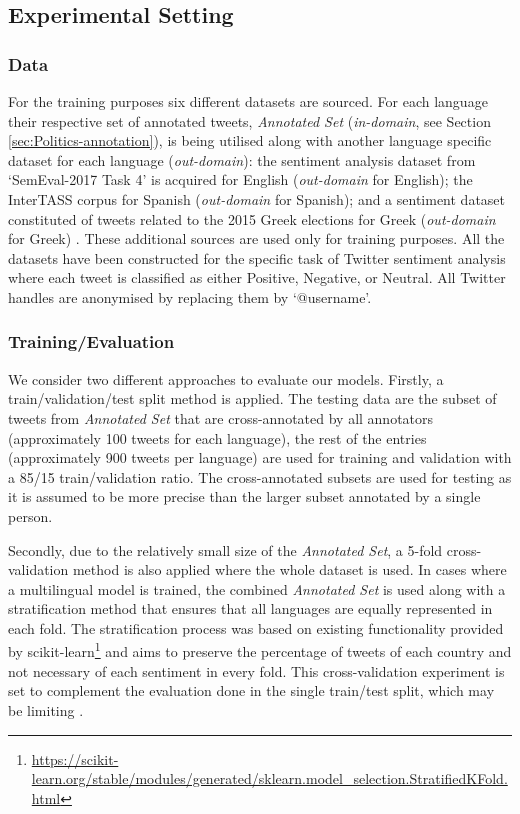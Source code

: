 \subsection{Experimental Setting} \label{sec:expsetting}
\subsubsection{Data} For the training purposes six different datasets are sourced. For each language their respective set of annotated tweets, \textit{Annotated Set} (\textit{in-domain}, see Section \ref{sec:Politics-annotation}), is being utilised along with another language specific dataset for each language (\textit{out-domain}): the sentiment analysis dataset from `SemEval-2017 Task 4' \cite{rosenthal2017semeval} is acquired for English (\textit{out-domain} for English); the InterTASS corpus \cite{diaz2018democratization} for Spanish (\textit{out-domain} for Spanish); and a sentiment dataset constituted of tweets related to the 2015 Greek elections for Greek (\textit{out-domain} for Greek) \cite{tsakalidis2018building}. These additional sources are used only for training purposes. All the datasets  have been constructed for the specific task of Twitter sentiment analysis where each tweet is classified as either Positive, Negative, or Neutral. All Twitter handles are anonymised by replacing them by `@username'.


\subsubsection{Training/Evaluation} We consider two different approaches to evaluate our models. Firstly, a train/validation/test split method is applied. The testing data are the subset of tweets from \textit{Annotated Set} that are cross-annotated by all annotators (approximately 100 tweets for each language), the rest of the entries (approximately 900 tweets per language) are used for training and validation with a 85/15 train/validation ratio. 
The cross-annotated subsets are used for testing as it is assumed to be more precise than the larger subset annotated by a single person.

Secondly, due to the relatively small size of the \textit{Annotated Set}, a 5-fold cross-validation method is also applied where the whole dataset is used. In cases where a multilingual model is trained, the combined \textit{Annotated Set} is used along with a stratification method that ensures that all languages are equally represented in each fold. 
The stratification process was based on existing functionality provided by scikit-learn\footnote{\url{https://scikit-learn.org/stable/modules/generated/sklearn.model_selection.StratifiedKFold.html}} and aims to preserve the percentage of tweets of each country and not necessary of each sentiment in every fold.
This cross-validation experiment is set to complement the evaluation done in the single train/test split, which may be limiting \cite{gorman-bedrick-2019-need}.

